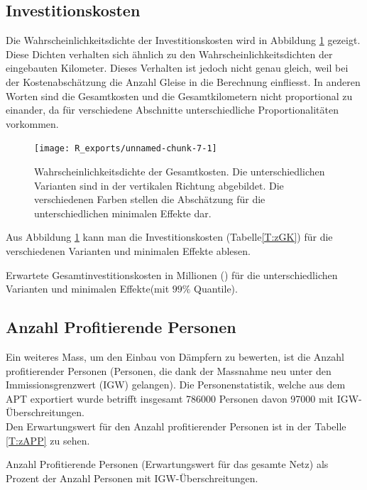 \FloatBarrier
\subsection{Investitionskosten}
Die Wahrscheinlichkeitsdichte der Investitionskosten wird in Abbildung \ref{F:pGK} gezeigt. Diese Dichten verhalten sich ähnlich zu den Wahrscheinlichkeitsdichten der eingebauten Kilometer. Dieses Verhalten ist jedoch nicht genau gleich, weil bei der Kostenabschätzung die Anzahl Gleise in die Berechnung einfliesst. In anderen Worten sind die Gesamtkosten und die Gesamtkilometern nicht proportional zu einander, da für verschiedene Abschnitte unterschiedliche Proportionalitäten vorkommen.\\
\begin{figure}[!htb]
	\centering
\begin{knitrout}
\color{fgcolor}
\texttt{[image: R\_exports/unnamed-chunk-7-1]} 

\end{knitrout}
	\caption{Wahrscheinlichkeitsdichte der Gesamtkosten. Die unterschiedlichen Varianten sind in der vertikalen Richtung abgebildet. Die verschiedenen Farben stellen die Abschätzung für die unterschiedlichen minimalen Effekte dar.}
	\label{F:pGK}
\end{figure}

Aus Abbildung \ref{F:pGK} kann man die Investitionskosten (Tabelle\ref{T:zGK}) für die verschiedenen Varianten und minimalen Effekte ablesen.
\begin{table}[!htb]
	\begin{center}
	
	\caption{ Erwartete Gesamtinvestitionskosten in Millionen (\si{\CHF}) für die unterschiedlichen Varianten und minimalen Effekte(mit $99\%$ Quantile). }
	\label{T:zGK}
\end{center}
\end{table}
\FloatBarrier

\subsection{Anzahl Profitierende Personen}
Ein weiteres Mass, um den Einbau von Dämpfern zu bewerten, ist die Anzahl profitierender Personen (Personen, die dank der Massnahme neu unter den Immissionsgrenzwert (IGW) gelangen). Die Personenstatistik, welche aus dem APT exportiert wurde betrifft insgesamt \num[fixed-exponent = 0]{786000} Personen davon \num[fixed-exponent = 0]{97000}  mit IGW-Überschreitungen.\\
Den Erwartungswert für den Anzahl profitierender Personen ist in der Tabelle \ref{T:zAPP} zu sehen.
\begin{table}[!htb]
	\begin{center}
	
	\caption{Anzahl Profitierende Personen (Erwartungswert für das gesamte Netz) als Prozent der Anzahl Personen mit IGW-Überschreitungen. }
	\label{T:zAPP}
	\end{center}
\end{table}
